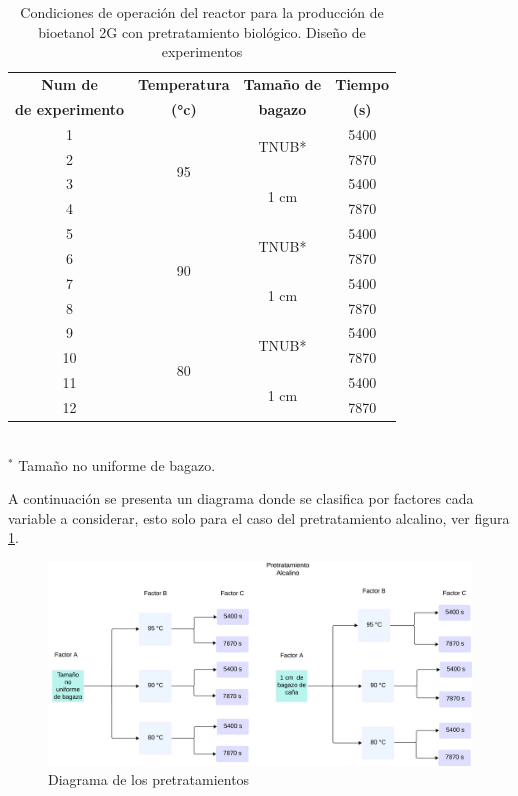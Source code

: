 \documentclass[12pt]{article}
\begin{document}
\begin{table}[H]
	\centering
	\caption{Condiciones de operación del reactor para la producción de bioetanol 2G con pretratamiento biológico. Diseño de experimentos}
	\label{alcalino}
	\begin{tabular}{|c|c|c|c|}
		\hline
		\textbf{Num de} & \textbf{Temperatura} & \textbf{Tamaño de } & \textbf{Tiempo} \\ 
		\textbf{de experimento}	&\textbf{ (°c)}&\textbf{ bagazo}  &\textbf{(s)}	\\ \hline
		1 & \multirow{4}{*}{95} & \multirow{2}{*}{TNUB*} & 5400   \\ \cline{1-1} \cline{4-4}
		2 &  &  & 7870  \\ \cline{3-4}  \cline{1-1} 
		3 &  & \multirow{2}{*}{1 cm} & 5400  \\  \cline{1-1} \cline{4-4}
		4 &  &  & 7870  \\ \cline{1-1}  \hline
		5 & \multirow{4}{*}{90}& \multirow{2}{*}{TNUB*} & 5400  \\ \cline{1-1}  \cline{4-4}
		6 &  &  & 7870   \\ \cline{1-1} \cline{3-4}
		7 &  & \multirow{2}{*}{1 cm} & 5400  \\ \cline{1-1}\cline{4-4}
		8 &  &  & 7870 \\ \hline
		9 & \multirow{4}{*}{80} & \multirow{2}{*}{TNUB*} & 5400  \\ \cline{1-1}\cline{4-4}
		10 &  &  & 7870   \\ \cline{1-1} \cline{3-4}
		11 &  &\multirow{2}{*}{1 cm} & 5400 \\ \cline{1-1}\cline{4-4}
		12 &  &  & 7870  \\ \hline
	\end{tabular}
		\\[3 pt] %
	\footnotesize{$^{*}$  Tamaño no uniforme de bagazo.}
\end{table}



A continuación se presenta un diagrama donde se clasifica por factores cada variable a considerar, esto solo para el caso del pretratamiento alcalino, ver figura  \ref{Diagrama1}.



\begin{figure} [H]
	\centering
	\includegraphics[width=0.9\linewidth]{imagenes/Diagrama alcalino}
	\caption{Diagrama de los pretratamientos}
	\label{Diagrama1}
\end{figure}
\end{document}
